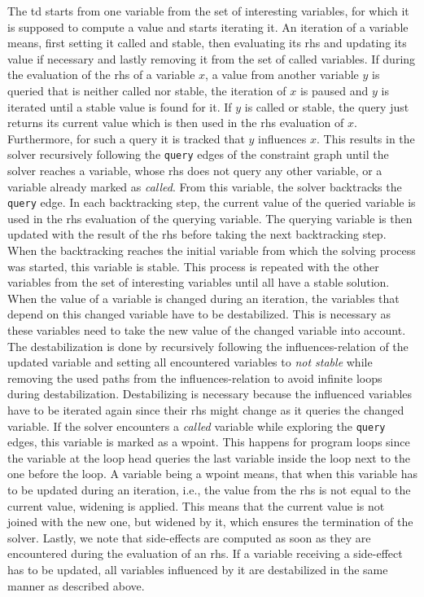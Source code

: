   The \ac{td} starts from one variable from the set of interesting variables, for which it is supposed to compute a value and starts iterating it. An iteration of a variable means, first setting it called and stable, then evaluating its \ac{rhs} and updating its value if necessary and lastly removing it from the set of called variables. If during the evaluation of the \ac{rhs} of a variable $x$, a value from another variable $y$ is queried that is neither called nor stable, the iteration of $x$ is paused and $y$ is iterated until a stable value is found for it. If $y$ is called or stable, the query just returns its current value which is then used in the \ac{rhs} evaluation of $x$. Furthermore, for such a query it is tracked that $y$ influences $x$. This results in the solver recursively following the \texttt{query} edges of the constraint graph until the solver reaches a variable, whose \ac{rhs} does not query any other variable, or a variable already marked as \textit{called}. From this variable, the solver backtracks the \texttt{query} edge. In each backtracking step, the current value of the queried variable is used in the \ac{rhs} evaluation of the querying variable. The querying variable is then updated with the result of the \ac{rhs} before taking the next backtracking step. When the backtracking reaches the initial variable from which the solving process was started, this variable is stable. This process is repeated with the other variables from the set of interesting variables until all have a stable solution.
  When the value of a variable is changed during an iteration, the variables that depend on this changed variable have to be destabilized. This is necessary as these variables need to take the new value of the changed variable into account. The destabilization is done by recursively following the influences-relation of the updated variable and setting all encountered variables to \textit{not stable} while removing the used paths from the influences-relation to avoid infinite loops during destabilization. Destabilizing is necessary because the influenced variables have to be iterated again since their \ac{rhs} might change as it queries the changed variable.
  If the solver encounters a \textit{called} variable while exploring the \texttt{query} edges, this variable is marked as a wpoint. This happens for program loops since the variable at the loop head queries the last variable inside the loop next to the one before the loop. A variable being a wpoint means, that when this variable has to be updated during an iteration, i.e., the value from the \ac{rhs} is not equal to the current value, widening is applied. This means that the current value is not joined with the new one, but widened by it, which ensures the termination of the solver. 
  Lastly, we note that side-effects are computed as soon as they are encountered during the evaluation of an \ac{rhs}. If a variable receiving a side-effect has to be updated, all variables influenced by it are destabilized in the same manner as described above.
  